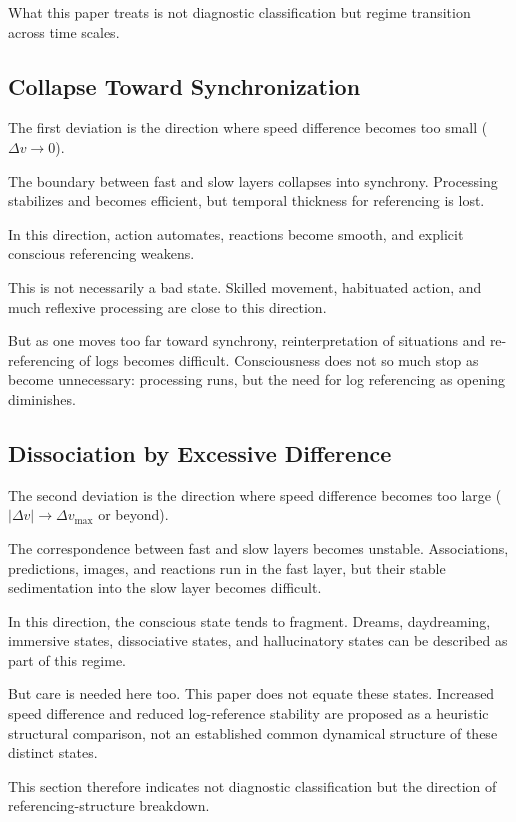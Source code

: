 What this paper treats is not diagnostic classification but regime transition across time scales.

\subsection{Collapse Toward Synchronization}


The first deviation is the direction where speed difference becomes too small ($\Delta v \rightarrow 0$).

The boundary between fast and slow layers collapses into synchrony. Processing stabilizes and becomes efficient, but temporal thickness for referencing is lost.

In this direction, action automates, reactions become smooth, and explicit conscious referencing weakens.

This is not necessarily a bad state. Skilled movement, habituated action, and much reflexive processing are close to this direction.

But as one moves too far toward synchrony, reinterpretation of situations and re-referencing of logs becomes difficult. Consciousness does not so much stop as become unnecessary: processing runs, but the need for log referencing as opening diminishes.

\subsection{Dissociation by Excessive Difference}


The second deviation is the direction where speed difference becomes too large ($|\Delta v| \rightarrow \Delta v_{\max}$ or beyond).

The correspondence between fast and slow layers becomes unstable. Associations, predictions, images, and reactions run in the fast layer, but their stable sedimentation into the slow layer becomes difficult.

In this direction, the conscious state tends to fragment. Dreams, daydreaming, immersive states, dissociative states, and hallucinatory states can be described as part of this regime.

But care is needed here too. This paper does not equate these states. Increased speed difference and reduced log-reference stability are proposed as a heuristic structural comparison, not an established common dynamical structure of these distinct states.

This section therefore indicates not diagnostic classification but the direction of referencing-structure breakdown.

